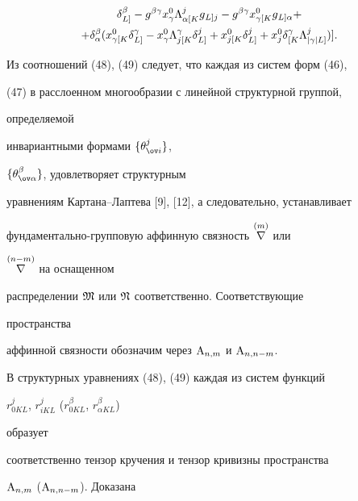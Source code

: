 \begin{gather}
\delta{}^\beta_{L]}-g^{\beta\gamma}x^0_\gamma 


\Lambda{}^j_{\alpha[K}g{}_{L]j}-g^{\beta\gamma} 


x{}^0_{\gamma[K}g{}_{L]\alpha}+\notag \\ 


% 


+\delta^\beta_\alpha(x{}^0_{\gamma[K}\delta{}^\gamma_{L]} 


-x^0_\gamma\Lambda{}^\gamma_{j[K} 


\delta{}^j_{L]}+x{}^0_{j[K}\delta{}^j_{L]}+ 


x^0_j\delta{}^\gamma_{[K}\Lambda{}^j_{|\gamma|L]})]. 


\end{gather} 


 


Из соотношений (48), (49) следует, что каждая из систем форм (46), 


(47) в расслоенном многообразии с линейной структурной группой, 


определяемой 


инвариантными формами $\{\theta^j_{\ov i}\}$, 


$\{\theta^\beta_{\ov\alpha}\}$, удовлетворяет структурным 


уравнениям Картана--Лаптева [9], [12], а следовательно, устанавливает 


фундаментально-групповую аффинную связность $\overset{(m)}{\nabla}{}$ или 


$\overset{(n-m)}{\nabla}{}$ на оснащенном 


распределении $\frak M$ или $\frak N$ соответственно. Соответствующие 


пространства 


аффинной связности обозначим через $\mathrm{A}_{n,m}$ и $\mathrm{A}_{n,n-m}$.


В структурных уравнениях (48), (49) каждая из систем функций 


$r^j_{0K L}$, $r^j_{i K L}$ ($r^\beta_{0K L}$, $r^\beta_{\alpha K L}$) 


образует 


соответственно тензор кручения и тензор кривизны пространства 


$\mathrm{A}_{n,m}$ ($\mathrm{A}_{n,n-m}$). Доказана 


 


